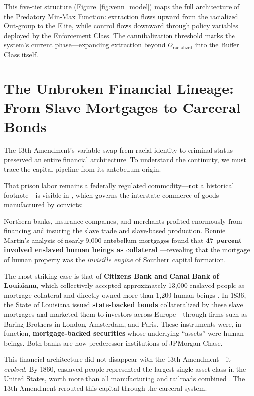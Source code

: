 This five-tier structure (Figure~\ref{fig:venn_model}) maps the full architecture of the Predatory Min-Max Function: extraction flows upward from the racialized Out-group to the Elite, while control flows downward through policy variables deployed by the Enforcement Class. The cannibalization threshold marks the system's current phase---expanding extraction beyond $O_{\text{racialized}}$ into the Buffer Class itself.

\section{The Unbroken Financial Lineage: From Slave Mortgages to Carceral Bonds}

The 13th Amendment's variable swap from racial identity to criminal status preserved an entire financial architecture. To understand the continuity, we must trace the capital pipeline from its antebellum origin.

That prison labor remains a federally regulated commodity---not a historical footnote---is visible in , which governs the interstate commerce of goods manufactured by convicts:

Northern banks, insurance companies, and merchants profited enormously from financing and insuring the slave trade and slave-based production. Bonnie Martin's analysis of nearly 9,000 antebellum mortgages found that \textbf{47 percent involved enslaved human beings as collateral} \cite{martin}---revealing that the mortgage of human property was the \textit{invisible engine} of Southern capital formation.

The most striking case is that of \textbf{Citizens Bank and Canal Bank of Louisiana}, which collectively accepted approximately 13,000 enslaved people as mortgage collateral and directly owned more than 1,200 human beings \cite{baptist, murphy}. In 1836, the State of Louisiana issued \textbf{state-backed bonds} collateralized by these slave mortgages and marketed them to investors across Europe---through firms such as Baring Brothers in London, Amsterdam, and Paris. These instruments were, in function, \textbf{mortgage-backed securities} whose underlying ``assets'' were human beings. Both banks are now predecessor institutions of JPMorgan Chase.

This financial architecture did not disappear with the 13th Amendment---it \textit{evolved}. By 1860, enslaved people represented the largest single asset class in the United States, worth more than all manufacturing and railroads combined \cite{baptist, beckert}. The 13th Amendment rerouted this capital through the carceral system.

